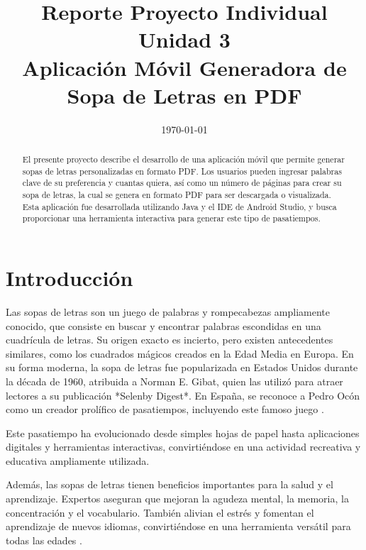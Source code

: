 \documentclass[conference]{IEEEtran}
\date{\specialdate\today}
\begin{document}
\title{Reporte Proyecto Individual Unidad 3 \\ Aplicación Móvil Generadora de Sopa de Letras en PDF}

\author{
}

\maketitle

\begin{abstract} 
El presente proyecto describe el desarrollo de una aplicación móvil que permite generar sopas de letras personalizadas en formato PDF. Los usuarios pueden ingresar palabras clave de su preferencia y cuantas quiera, así como un número de páginas para crear su sopa de letras, la cual se genera en formato PDF para ser descargada o visualizada. Esta aplicación fue desarrollada utilizando Java y el IDE de Android Studio, y busca proporcionar una herramienta interactiva para generar este tipo de pasatiempos.

\end{abstract}

\section{Introducción}

Las sopas de letras son un juego de palabras y rompecabezas ampliamente conocido, que consiste en buscar y encontrar palabras escondidas en una cuadrícula de letras. Su origen exacto es incierto, pero existen antecedentes similares, como los cuadrados mágicos
creados en la Edad Media en Europa. En su forma moderna, la sopa de letras fue popularizada en Estados Unidos durante la década de 1960, atribuida a Norman E. Gibat, quien las utilizó para atraer lectores a su publicación *Selenby Digest*. En España, se reconoce a Pedro Ocón como un creador prolífico de pasatiempos, incluyendo este famoso juego \cite{milenio}.

Este pasatiempo ha evolucionado desde simples hojas de papel hasta aplicaciones digitales y herramientas interactivas, convirtiéndose en una actividad recreativa y educativa ampliamente utilizada.

Además, las sopas de letras tienen beneficios importantes para la salud y el aprendizaje. Expertos aseguran que mejoran la agudeza mental, la memoria, la concentración y el vocabulario. También alivian el estrés y fomentan el aprendizaje de nuevos idiomas, convirtiéndose en una herramienta versátil para todas las edades \cite{lanacion}.
\end{document}
